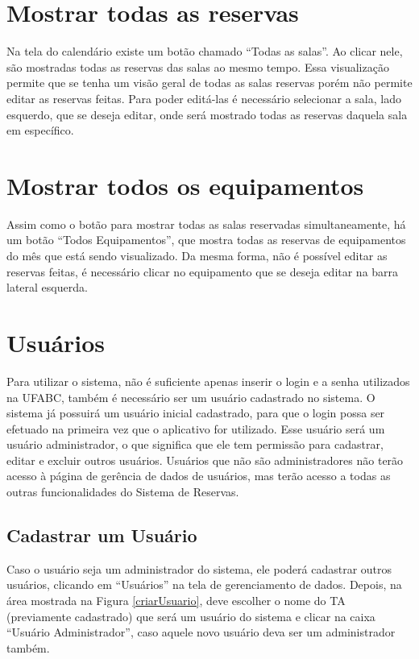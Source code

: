 \documentclass[openany,10pt,a4paper]{book}
\begin{document}
\section{Mostrar todas as reservas}
Na tela do calendário existe um botão chamado ``Todas as salas''. Ao clicar nele, são mostradas todas as reservas das salas ao mesmo tempo. Essa visualização permite que se tenha um visão geral de todas as salas reservas porém não permite editar as reservas feitas. Para poder editá-las é necessário selecionar a sala, lado esquerdo, que se deseja editar, onde será  mostrado todas as reservas daquela sala em específico.

\section{Mostrar todos os equipamentos}
Assim como o botão para mostrar todas as salas reservadas simultaneamente, há um botão ``Todos Equipamentos'', que mostra todas as reservas de equipamentos do mês que está sendo visualizado. Da mesma forma, não é possível editar as reservas feitas, é necessário clicar no equipamento que se deseja editar na barra lateral esquerda. 

\section{Usuários}
Para utilizar o sistema, não é suficiente apenas inserir o login e a senha utilizados na UFABC, também é necessário ser um usuário cadastrado no sistema. O sistema já possuirá um usuário inicial cadastrado, para que o login possa ser efetuado na primeira vez que o aplicativo for utilizado. Esse usuário será um usuário administrador, o que significa que ele tem permissão para cadastrar, editar e excluir outros usuários. Usuários que não são administradores não terão acesso à página de gerência de dados de usuários, mas terão acesso a todas as outras funcionalidades do Sistema de Reservas. 

\subsection{Cadastrar um Usuário}

Caso o usuário seja um administrador do sistema, ele poderá cadastrar outros usuários, clicando em ``Usuários'' na tela de gerenciamento de dados. Depois, na área mostrada na Figura \ref{criarUsuario}, deve escolher o nome do TA (previamente cadastrado) que será um usuário do sistema e clicar na caixa ``Usuário Administrador'', caso aquele novo usuário deva ser um administrador também. 
\end{document}
